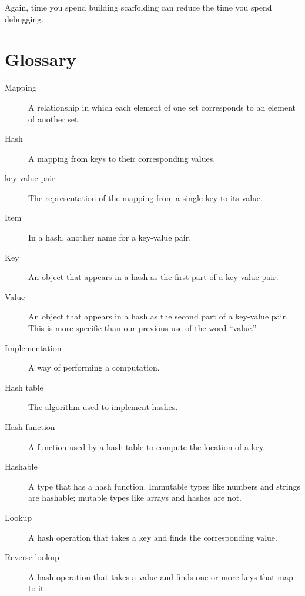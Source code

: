 Again, time you spend building scaffolding can reduce
the time you spend debugging.


\section{Glossary}

\begin{description}

\item[Mapping] A relationship in which each element of one set
corresponds to an element of another set.

\item[Hash] A mapping from keys to their
corresponding values.

\item[key-value pair:] The representation of the mapping from
a single key to its value.

\item[Item] In a hash, another name for a key-value
  pair.

\item[Key] An object that appears in a hash as the
first part of a key-value pair.

\item[Value] An object that appears in a hash as the
second part of a key-value pair.  This is more specific than
our previous use of the word ``value.''

\item[Implementation] A way of performing a computation.

\item[Hash table] The algorithm used to implement hashes.

\item[Hash function] A function used by a hash table to 
compute the location of a key.

\item[Hashable] A type that has a hash function.  Immutable
types like numbers and strings are hashable; mutable types 
like arrays and hashes are not.

\item[Lookup] A hash operation that takes a key and finds
the corresponding value.

\item[Reverse lookup] A hash operation that takes a value and finds
one or more keys that map to it.


\end{description}
